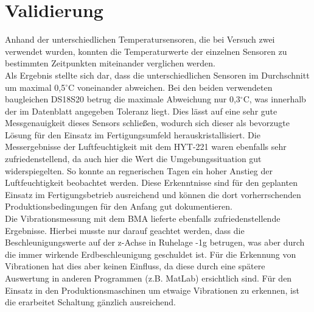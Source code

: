 \section{Validierung}
\label{section_Validierung}
Anhand der unterschiedlichen Temperatursensoren, die bei Versuch zwei verwendet wurden, konnten die Temperaturwerte der einzelnen Sensoren zu bestimmten Zeitpunkten miteinander verglichen werden.\\
Als Ergebnis stellte sich dar, dass die unterschiedlichen Sensoren im Durchschnitt um maximal 0,5$^\circ\text{C}$ voneinander abweichen. Bei den beiden verwendeten baugleichen DS18S20 betrug die maximale Abweichung nur 0,3$^\circ\text{C}$, was innerhalb der im Datenblatt angegeben Toleranz liegt. Dies lässt auf eine sehr gute Messgenauigkeit dieses Sensors schließen, wodurch sich dieser als bevorzugte Lösung für den Einsatz im Fertigungsumfeld herauskristallisiert. Die Messergebnisse der Luftfeuchtigkeit mit dem HYT-221 waren ebenfalls sehr zufriedenstellend, da auch hier die Wert die Umgebungssituation gut widerspiegelten. So konnte an regnerischen Tagen ein hoher Anstieg der Luftfeuchtigkeit beobachtet werden. Diese Erkenntnisse sind für den geplanten Einsatz im Fertigungsbetrieb ausreichend und können die dort vorherrschenden Produktionsbedingungen für den Anfang gut dokumentieren.\\
Die Vibrationsmessung mit dem BMA lieferte ebenfalls zufriedenstellende Ergebnisse. Hierbei musste nur darauf geachtet werden, dass die Beschleunigungswerte auf der z-Achse in Ruhelage -1\;g betrugen, was aber durch die immer wirkende Erdbeschleunigung geschuldet ist. Für die Erkennung von Vibrationen hat dies aber keinen Einfluss, da diese durch eine spätere Auswertung in anderen Programmen (z.B. MatLab) ersichtlich sind. Für den Einsatz in den Produktionsmaschinen um etwaige Vibrationen zu erkennen, ist die erarbeitet Schaltung gänzlich ausreichend.
